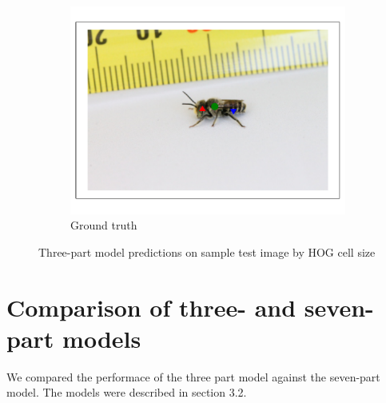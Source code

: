 \documentclass[11pt, oneside]{report}
\begin{document}
\begin{figure}[p]
\begin{subfigure}[b]{0.3\textwidth}
                \includegraphics[width=\textwidth]{hog_gt3.pdf}
                \caption{Ground truth}
            \end{subfigure}

            \hspace{0pt}

            \begin{subfigure}[b]{0.2\textwidth}
                \centering
            \end{subfigure}
            \caption{Three-part model predictions on sample test image by HOG cell size}
            \label{fig:hog_vis3}
        \end{figure}
    \section{Comparison of three- and seven-part models}
        We compared the performace of the three part model against the seven-part model. The models were described in section 3.2.
\end{document}
